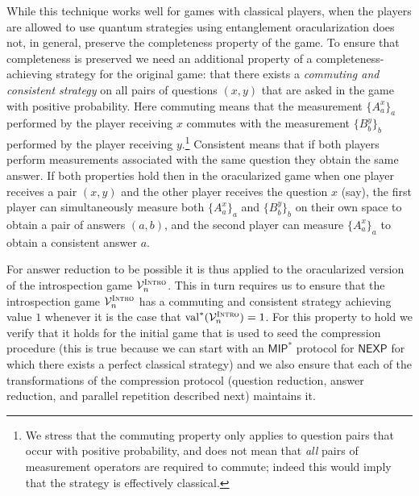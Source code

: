 \documentclass[11pt]{article}
\theoremstyle{definition}
\newcommand{\val}{\ensuremath{\mathrm{val}}}
\newcommand{\verifier}{\mathcal{V}}
\newcommand{\gamestyle}[1]{\ensuremath{\textsc{#1}}\xspace}
\newcommand{\intro}{\gamestyle{Intro}}
\newcommand{\class}[1]{\ensuremath{\mathsf{#1}}\xspace}
\newcommand{\NEXP}{\class{NEXP}} %
\newcommand{\MIP}{\class{MIP}} %
\begin{document}
While this technique works well for games with classical players, when the players are allowed to use quantum strategies using entanglement oracularization does not, in general, preserve the completeness property of the game. To ensure that completeness is preserved we need an additional property of a completeness-achieving strategy for the original game: that there exists a \emph{commuting and consistent strategy} on all pairs of questions $(x,y)$ that are asked in the game with positive probability. Here commuting means that the measurement $\{A^x_a\}_a$ performed by the player receiving $x$ commutes with the measurement $\{B^y_b\}_b$ performed by the player receiving $y$.\footnote{We stress that the commuting property only applies to question pairs that occur with positive probability, and does not mean that \emph{all} pairs of measurement operators are required to commute; indeed this would imply that the strategy is effectively classical.} Consistent means that if both players perform measurements associated with the same question they obtain the same answer. If both properties hold then in the oracularized game when one player receives a pair $(x,y)$ and the other player receives the question $x$ (say), the first player can simultaneously measure both $\{A^x_a\}_a$ and $\{B^y_b\}_b$ on their own space to obtain a pair of answers $(a,b)$, and the second player can measure $\{A^x_a\}_a$ to obtain a consistent answer $a$.

For answer reduction to be possible it is thus applied to the {oracularized} version of the introspection game $\verifier^\intro_n$. This in turn requires us to ensure that the introspection game $\verifier^\intro_n$ has a commuting and consistent strategy achieving value $1$ whenever it is the case that $\val^*(\verifier_n^\intro)=1$. For this property to hold we verify that it holds for the initial game that is used to seed the compression procedure (this is true because we can start with an $\MIP^*$ protocol for $\NEXP$ for which there exists a perfect classical strategy) and we also ensure that each of the transformations of the compression protocol (question reduction, answer reduction, and parallel repetition described next) maintains it.
\end{document}
